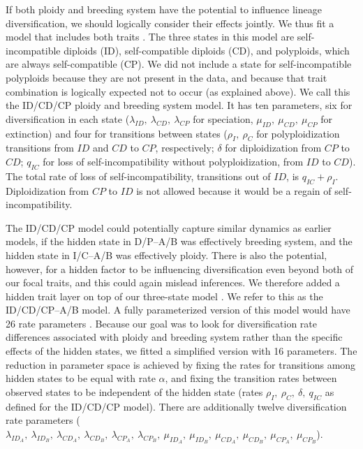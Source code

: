 If both ploidy and breeding system have the potential to influence lineage diversification, we should logically consider their effects jointly.
We thus fit a model that includes both traits \citep[MuSSE,][]{fitzjohn_2012}.
The three states in this model are self-incompatible diploids (ID), self-compatible diploids (CD), and polyploids, which are always self-compatible (CP).
We did not include a state for self-incompatible polyploids because they are not present in the data, and because that trait combination is logically expected not to occur (as explained above).
We call this the ID/CD/CP ploidy and breeding system model.
It has ten parameters, six for diversification in each state ($\lambda_{ID},\ \lambda_{CD},\ \lambda_{CP}$ for speciation, $\mu_{ID},\ \mu_{CD},\ \mu_{CP}$ for extinction) and four for transitions between states ($\rho_I,\ \rho_C$ for polyploidization transitions from $ID$ and $CD$ to $CP$, respectively; $\delta$ for diploidization from $CP$ to $CD$; $q_{IC}$ for loss of self-incompatibility without polyploidization, from $ID$ to $CD$).
The total rate of loss of self-incompatibility, \ie transitions out of $ID$, is $q_{IC} + \rho_I$.
Diploidization from $CP$ to $ID$ is not allowed because it would be a regain of self-incompatibility.

The ID/CD/CP model could potentially capture similar dynamics as earlier models, if the hidden state in D/P--A/B was effectively breeding system, and the hidden state in I/C--A/B was effectively ploidy.
There is also the potential, however, for a hidden factor to be influencing diversification even beyond both of our focal traits, and this could again mislead inferences.
We therefore added a hidden trait layer on top of our three-state model \citep[analogous to][]{caetano_2018, herrera_2018, huang_2018}.
We refer to this as the ID/CD/CP--A/B model.
A fully parameterized version of this model would have 26 rate parameters \citep{herrera_2018}. 
Because our goal was to look for diversification rate differences associated with ploidy and breeding system rather than the specific effects of the hidden states, we fitted a simplified version with 16 parameters.
The reduction in parameter space is achieved by fixing the rates for transitions among hidden states to be equal with rate $\alpha$, and fixing the transition rates between observed states to be independent of the hidden state (rates $\rho_I,\ \rho_C,\ \delta,\ q_{IC}$ as defined for the ID/CD/CP model).
There are additionally twelve diversification rate parameters ($\lambda_{ID_A},\ \lambda_{ID_B},\ \lambda_{CD_A},\ \lambda_{CD_B},\ \lambda_{CP_A},\ \lambda_{CP_B},\ \mu_{ID_A},\ \mu_{ID_B},\ \mu_{CD_A},\ \mu_{CD_B},\ \mu_{CP_A},\ \mu_{CP_B}$).

